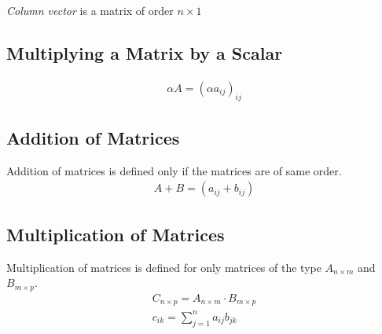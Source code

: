 \documentclass[fleqn]{article}
\begin{document}
\emph{Column vector} is a matrix of order $n \times 1$\\

\subsection{Multiplying a Matrix by a Scalar}

\begin{align*}
	\alpha A = (\alpha a_{ij})_{ij}
\end{align*}

\subsection{Addition of Matrices}

Addition of matrices is defined only if the matrices are of same order.
\begin{align*}
	A + B = (a_{ij} + b_{ij})
\end{align*}

\subsection{Multiplication of Matrices}

Multiplication of matrices is defined for only matrices of the type $A_{n \times m}$ and $B_{m \times p}$.\\
\begin{align*}
	C_{n \times p} = A_{n \times m} \cdot B_{m \times p}\\
	c_{ik} = \sum_{j = 1}^{n} a_{ij} b_{jk}
\end{align*}
\end{document}
